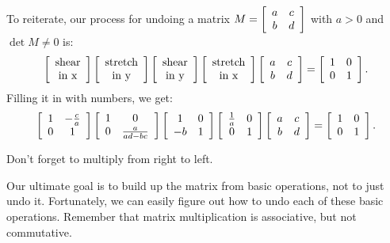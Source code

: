 \documentclass[../textbook.tex]{subfiles}
\begin{document}
\noindent To reiterate, our process for undoing a matrix $M=\left[\begin{array}{cc} a & c \\ b & d \end{array}\right]$ with $a>0$ and $\det M\neq 0$ is:
$$\left[\begin{array}{c}\text{shear} \\ \text{in x}\end{array}\right]
\left[\begin{array}{c}\text{stretch} \\ \text{in y}\end{array}\right]
\left[\begin{array}{c}\text{shear} \\ \text{in y}\end{array}\right]
\left[\begin{array}{c}\text{stretch} \\ \text{in x}\end{array}\right]
\left[\begin{array}{cc} a & c \\ b & d \end{array}\right]=\left[\begin{array}{cc} 1 & 0 \\ 0 & 1 \end{array}\right].$$
Filling it in with numbers, we get:
$$\left[\begin{array}{cc} 1 & -\frac{c}{a} \\ 0 & 1 \end{array}\right]\left[\begin{array}{cc} 1 & 0 \\ 0 & \frac{a}{ad-bc} \end{array}\right]\left[\begin{array}{cc} 1 & 0 \\ -b & 1 \end{array}\right]\left[\begin{array}{cc} \frac{1}{a} & 0 \\ 0 & 1 \end{array}\right]\left[\begin{array}{cc} a & c \\ b & d \end{array}\right]=\left[\begin{array}{cc} 1 & 0 \\ 0 & 1 \end{array}\right].$$ \label{prob:list_of_matrices}

\noindent Don't forget to multiply from right to left.

Our ultimate goal is to build up the matrix from basic operations, not to just undo it. Fortunately, we can easily figure out how to undo each of these basic operations. Remember that matrix multiplication is associative, but not commutative.
\end{document}

